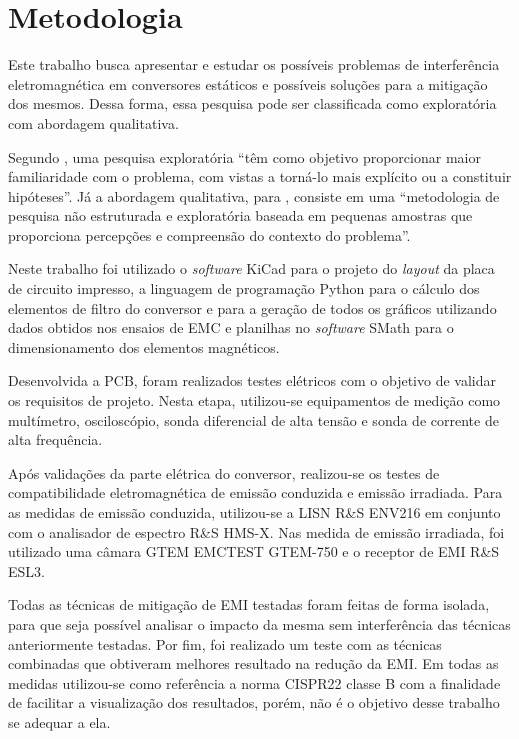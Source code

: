 \chapter{Metodologia}
    
    Este trabalho busca apresentar e estudar os possíveis problemas de interferência eletromagnética em conversores estáticos e possíveis soluções para a mitigação dos mesmos. Dessa forma, essa pesquisa pode ser classificada como exploratória com abordagem qualitativa. 
    
    Segundo , uma pesquisa exploratória ``têm como objetivo proporcionar maior familiaridade com o problema, com vistas a torná-lo mais explícito ou a constituir hipóteses''. Já a abordagem qualitativa, para , consiste em uma ``metodologia de pesquisa não estruturada e exploratória baseada em pequenas amostras que proporciona percepções e compreensão do contexto do problema''.
    
    Neste trabalho foi utilizado o \textit{software} KiCad para o projeto do \textit{layout} da placa de circuito impresso, a linguagem de programação Python para o cálculo dos elementos de filtro do conversor e para a geração de todos os gráficos utilizando dados obtidos nos ensaios de EMC e planilhas no \textit{software} SMath para o dimensionamento dos elementos magnéticos.
    
    Desenvolvida a PCB, foram realizados testes elétricos com o objetivo de validar os requisitos de projeto. Nesta etapa, utilizou-se equipamentos de medição como multímetro, osciloscópio, sonda diferencial de alta tensão e sonda de corrente de alta frequência. 
    
    Após validações da parte elétrica do conversor, realizou-se os testes de compatibilidade eletromagnética de emissão conduzida e emissão irradiada. Para as medidas de emissão conduzida, utilizou-se a LISN R\&S ENV216 em conjunto com o analisador de espectro R\&S HMS-X. Nas medida de emissão irradiada, foi utilizado uma câmara GTEM EMCTEST GTEM-750 e o receptor de EMI R\&S ESL3. 
    
    Todas as técnicas de mitigação de EMI testadas foram feitas de forma isolada, para que seja possível analisar o impacto da mesma sem interferência das técnicas anteriormente testadas. Por fim, foi realizado um teste com as técnicas combinadas que obtiveram melhores resultado na redução da EMI. Em todas as medidas utilizou-se como referência a norma CISPR22 classe B com a finalidade de facilitar a visualização dos resultados, porém, não é o objetivo desse trabalho se adequar a ela. 

    